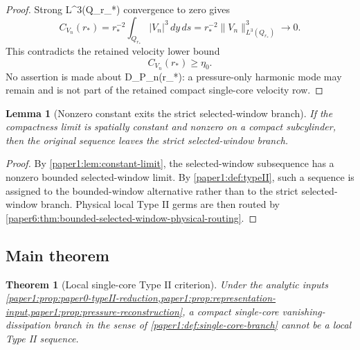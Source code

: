 \documentclass[11pt]{amsart}
\def\({}%
\def\){}%
\theoremstyle{plain}
\newtheorem{theorem}{Theorem}[section]
\newtheorem{lemma}[lemma]{Lemma}
\theoremstyle{definition}
\theoremstyle{remark}
\begin{document}
\begin{proof}
Strong \(L^3(Q_{r_*})\) convergence to zero gives
\[
  C_{V_n}(r_*)
  =
  r_*^{-2}\int_{Q_{r_*}}|V_n|^3\,dy\,ds
  =
  r_*^{-2}\|V_n\|_{L^3(Q_{r_*})}^3
  \to0.
\]
This contradicts the retained velocity lower bound
\[
  C_{V_n}(r_*)\ge\eta_0.
\]
No assertion is made about \(D_{P_n}(r_*)\): a pressure-only harmonic mode may
remain and is not part of the retained compact single-core velocity row.
\end{proof}

\begin{lemma}[Nonzero constant exits the strict selected-window branch]\label{paper1:lem:nonzero-contradiction}
If the compactness limit is spatially constant and nonzero on a compact
subcylinder, then the original sequence leaves the strict selected-window
branch.
\end{lemma}

\begin{proof}
By \cref{paper1:lem:constant-limit}, the selected-window subsequence has a nonzero
bounded selected-window limit.  By \cref{paper1:def:typeII}, such a sequence is
assigned to the bounded-window alternative rather than to the strict
selected-window branch.  Physical local Type II germs are then routed by
\cref{paper6:thm:bounded-selected-window-physical-routing}.
\end{proof}

\subsection{Main theorem}

\begin{theorem}[Local single-core Type II criterion]\label{paper1:thm:single-core-criterion}
Under the analytic inputs
\cref{paper1:prop:paper0-typeII-reduction,paper1:prop:representation-input,paper1:prop:pressure-reconstruction},
a compact single-core vanishing-dissipation branch in the sense of
\cref{paper1:def:single-core-branch} cannot be a local Type II sequence.
\end{theorem}
\end{document}
